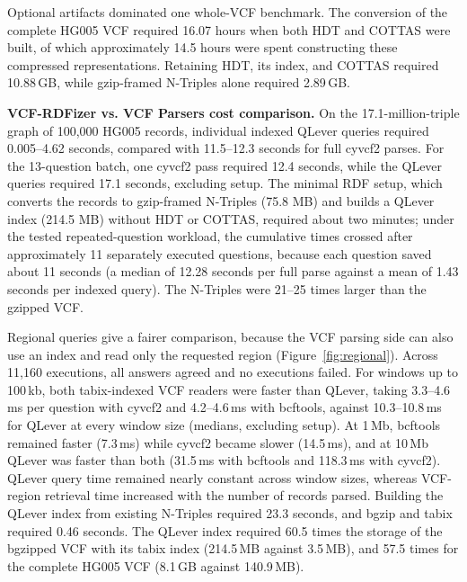 \documentclass[pdflatex,sn-mathphys-num]{sn-jnl}
\begin{document}
Optional artifacts dominated one whole-VCF benchmark.
The conversion of the complete HG005 VCF required 16.07 hours when both HDT and COTTAS were built, of which approximately 14.5 hours were spent constructing these compressed representations.
Retaining HDT, its index, and COTTAS required 10.88\,GB, while gzip-framed N-Triples alone required 2.89\,GB.

\textbf{VCF-RDFizer vs. VCF Parsers cost comparison.}
On the 17.1-million-triple graph of 100,000 HG005 records, individual indexed QLever queries required 0.005--4.62 seconds, compared with 11.5--12.3 seconds for full cyvcf2 parses.
For the 13-question batch, one cyvcf2 pass required 12.4 seconds, while the QLever queries required 17.1 seconds, excluding setup.
The minimal RDF setup, which converts the records to gzip-framed N-Triples (75.8 MB) and builds a QLever index (214.5 MB) without HDT or COTTAS, required about two minutes; under the tested repeated-question workload, the cumulative times crossed after approximately 11 separately executed questions, because each question saved about 11 seconds (a median of 12.28 seconds per full parse against a mean of 1.43 seconds per indexed query).
The N-Triples were 21--25 times larger than the gzipped VCF.

Regional queries give a fairer comparison, because the VCF parsing side can also use an index and read only the requested region (Figure~\ref{fig:regional}).
Across 11,160 executions, all answers agreed and no executions failed.
For windows up to 100\,kb, both tabix-indexed VCF readers were faster than QLever, taking 3.3--4.6\,ms per question with cyvcf2 and 4.2--4.6\,ms with bcftools, against 10.3--10.8\,ms for QLever at every window size (medians, excluding setup).
At 1\,Mb, bcftools remained faster (7.3\,ms) while cyvcf2 became slower (14.5\,ms), and at 10\,Mb QLever was faster than both (31.5\,ms with bcftools and 118.3\,ms with cyvcf2).
QLever query time remained nearly constant across window sizes, whereas VCF-region retrieval time increased with the number of records parsed.
Building the QLever index from existing N-Triples required 23.3 seconds, and bgzip and tabix required 0.46 seconds.
The QLever index required 60.5 times the storage of the bgzipped VCF with its tabix index (214.5\,MB against 3.5\,MB), and 57.5 times for the complete HG005 VCF (8.1\,GB against 140.9\,MB).
\end{document}
